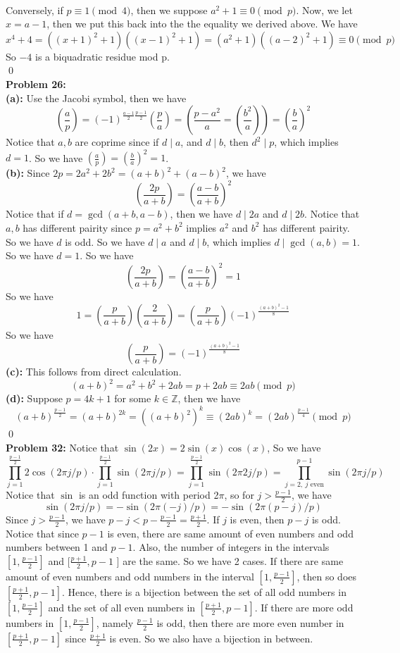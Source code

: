 \documentclass[12pt]{amsart}
\newcommand{\Z}{\mathbb{Z}}
\begin{document}
\\ Conversely, if $p\equiv 1 \pmod 4$, then we suppose $a^2+1\equiv 0\pmod p$. Now, we let $x=a-1$, then we put this back into the the equality we derived above. We have 
\[x^4+4=((x+1)^2+1)((x-1)^2+1)=(a^2+1)((a-2)^2+1)\equiv 0\pmod p\]
So $-4$ is a biquadratic residue mod p.
\\\qed\\
\textbf{Problem 26:}
\\\textbf{(a): } Use the Jacobi symbol, then we have 
\[(\frac{a}{p})=(-1)^{\frac{a-1}{2}\frac{p-1}{2}}(\frac{p}{a})=(\frac{p-a^2}{a}=(\frac{b^2}{a}))=(\frac{b}{a})^2\]
Notice that $a,b$ are coprime since if $d\mid a$, and $d\mid b$, then $d^2\mid p$, which implies $d=1$.
So we have $(\frac{a}{p})=(\frac{b}{a})^2=1$.
\\\textbf{(b):} Since $2p=2a^2+2b^2=(a+b)^2+(a-b)^2$, we have 
\[(\frac{2p}{a+b})=(\frac{a-b}{a+b})^2\]
Notice that if $d=\gcd(a+b,a-b)$, then we have $d\mid 2a$ and $d\mid 2b$. Notice that $a,b$ has different pairity since $p=a^2+b^2$ implies $a^2$ and $b^2$ has different pairity. So we have $d$ is odd. So we have $d\mid a $ and $d\mid b$, which implies $d\mid \gcd(a,b)=1$. So we have $d=1$. So we have 
\[(\frac{2p}{a+b})=(\frac{a-b}{a+b})^2=1\]
So we have 
\[1=(\frac{p}{a+b})(\frac{2}{a+b})=(\frac{p}{a+b})(-1)^{\frac{(a+b)^2-1}{8}}\]
So we have 
\[(\frac{p}{a+b})=(-1)^{\frac{(a+b)^2-1}{8}}\]
\textbf{(c):} This follows from direct calculation.
\[(a+b)^2=a^2+b^2+2ab=p+2ab\equiv 2ab\pmod p\]
\textbf{(d): } Suppose $p=4k+1$ for some $k\in\Z$, then we have 
\[(a+b)^\frac{p-1}{2}=(a+b)^{2k}=((a+b)^2)^k\equiv (2ab)^k=(2ab)^\frac{p-1}{4}\pmod p\]
\qed\\
\textbf{Problem 32:} Notice that $\sin(2x)=2\sin(x)\cos(x)$, So we have 
\[\prod_{j=1}^{\frac{p-1}{2}}2\cos(2\pi j/p)\cdot \prod_{j=1}^{\frac{p-1}{2}}\sin(2\pi j/p)=\prod_{j=1}^{\frac{p-1}{2}}\sin(2\pi 2j/p)=\prod_{j=2,\ j \text{ even}}^{p-1}\sin(2\pi j/p)\]
Notice that $\sin$ is an odd function with period 2$\pi$, so for $j>\frac{p-1}{2}$, we have 
\[\sin(2\pi j /p)=-\sin(2\pi (-j)/p)=-\sin (2\pi (p-j)/p)\]
Since $j>\frac{p-1}{2}$, we have $p-j<p-\frac{p-1}{2}=\frac{p+1}{2}$. If $j$ is even, then $p-j$ is odd. Notice that since $p-1$ is even, there are same amount of even numbers and odd numbers between 1 and $p-1$. Also, the number of integers in the intervals $[1,\frac{p-1}{2}]$ and $[\frac{p+1}{2},p-1 $ ] are the same. So we have 2 cases. If there are same amount of even numbers and odd numbers in the interval $[1,\frac{p-1}{2}]$, then so does $[\frac{p+1}{2},p-1]$. Hence, there is a bijection between the set of all odd numbers in $[1,\frac{p-1}{2}]$ and the set of all even numbers in $[\frac{p+1}{2},p-1]$. If there are more odd numbers in $[1,\frac{p-1}{2}]$, namely $\frac{p-1}{2}$ is odd, then there are more even number in $[\frac{p+1}{2},p-1]$ since $\frac{p+1   }{2}$ is even. So we also have a bijection in between.
\end{document}
